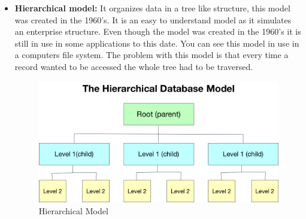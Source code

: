 \begin{itemize}
	\item {\textbf{Hierarchical model:} It organizes data in a tree like structure, this model was created in the 1960’s. It is an easy to understand model as it simulates an enterprise structure. Even though the model was created in the 1960’s it is still in use in some applications to this date. You can see this model in use in a computers file system. The problem with this model is that every time a record wanted to be accessed the whole tree had to be traversed.

	\begin{center}
		\begin{figure}[h!]
			\centering
			\includegraphics[scale=0.22]{./images/3-hierarchical-model}
			\caption{Hierarchical Model}
			\label{hier_model}
		\end{figure}
	\end{center}
	}
	

\end{itemize}
